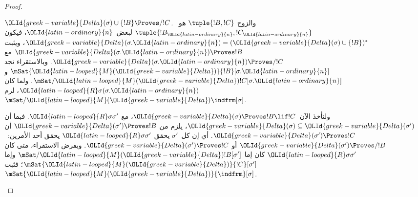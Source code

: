\documentclass[../../../include/open-logic-section]{subfiles}
\begin{document}
\begin{proof}
\begin{enumerate}
{      ${\OLId{greek-variable}{Delta}}(\sigma) \cup \{!B\} \Proves/ !C$. والزوج
      $\tuple{!B, !C}$ هو~$\tuple{!B_{\OLId{latin-ordinary}{n}}, !C_{\OLId{latin-ordinary}{n}}}$ لبعض~${\OLId{latin-ordinary}{n}}$، فيكون
      ${\OLId{greek-variable}{Delta}}(\sigma.{\OLId{latin-ordinary}{n}}) = ({\OLId{greek-variable}{Delta}}(\sigma) \cup \{!B\})^*$، ويثبت
      ${\OLId{greek-variable}{Delta}}(\sigma.{\OLId{latin-ordinary}{n}}) \Proves !B$ مع
      ${\OLId{greek-variable}{Delta}}(\sigma.{\OLId{latin-ordinary}{n}}) \Proves/ !C$. وبالاستقراء نجد
      $\mSat{{\OLId{latin-looped}{M}}({\OLId{greek-variable}{Delta}})}{!B}[\sigma.{\OLId{latin-ordinary}{n}}]$ و
      $\mSat/{{\OLId{latin-looped}{M}}({\OLId{greek-variable}{Delta}})}{!C}[\sigma.{\OLId{latin-ordinary}{n}}]$. ولما كان
      ${\OLId{latin-looped}{R}}\sigma(\sigma.{\OLId{latin-ordinary}{n}})$، لزم
      $\mSat/{{\OLId{latin-looped}{M}}({\OLId{greek-variable}{Delta}})}{\indfrm}[\sigma]$.

      ولنأخذ الآن~${\OLId{greek-variable}{Delta}}(\sigma) \Proves !B \lif !C$، مع
      ${\OLId{latin-looped}{R}}\sigma\sigma'$. فبما أن
      ${\OLId{greek-variable}{Delta}}(\sigma) \subseteq {\OLId{greek-variable}{Delta}}(\sigma')$، يلزم من
      ${\OLId{greek-variable}{Delta}}(\sigma') \Proves !B$ أن
      ${\OLId{greek-variable}{Delta}}(\sigma') \Proves !C$. أي إن كل~$\sigma'$ يحقق
      ${\OLId{latin-looped}{R}}\sigma\sigma'$ يحقق أحد الأمرين:~${\OLId{greek-variable}{Delta}}(\sigma') \Proves/ !B$ أو
      ${\OLId{greek-variable}{Delta}}(\sigma') \Proves !C$. وبفرض الاستقراء، متى كان
      ${\OLId{latin-looped}{R}}\sigma\sigma'$ كان إما
      $\mSat/{{\OLId{latin-looped}{M}}({\OLId{greek-variable}{Delta}})}{!B}[\sigma']$ وإما
      $\mSat{{\OLId{latin-looped}{M}}({\OLId{greek-variable}{Delta}})}{!C}[\sigma']$؛ فثبت
      $\mSat{{\OLId{latin-looped}{M}}({\OLId{greek-variable}{Delta}})}{\indfrm}[\sigma]$.}
  \end{enumerate}
\end{proof}
\end{document}
